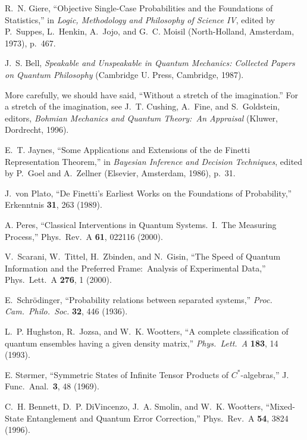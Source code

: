 \documentclass[12pt,aps,eqsecnum]{revtex4-1}
\begin{document}
\begin{thebibliography}{10}
R.~N. Giere, ``Objective Single-Case Probabilities and the Foundations
of Statistics,'' in {\sl Logic, Methodology and Philosophy of Science
IV}, edited by P.~Suppes, L.~Henkin, A.~Jojo, and G.~C. Moisil
(North-Holland, Amsterdam, 1973), p.~467.

J.~S. Bell, {\sl Speakable and Unspeakable in Quantum Mechanics:
Collected Papers on Quantum Philosophy\/} (Cambridge U. Press,
Cambridge, 1987).

More carefully, we should have said, ``Without a stretch of the
imagination.''  For a stretch of the imagination, see J.~T. Cushing,
A.~Fine, and S.~Goldstein, editors, {\sl  Bohmian Mechanics and Quantum
Theory:\ An Appraisal\/} (Kluwer, Dordrecht, 1996).

E.~T. Jaynes, ``Some Applications and Extensions of the de Finetti
Representation Theorem,'' in {\sl Bayesian Inference and Decision
Techniques}, edited by P.~Goel and A.~Zellner (Elsevier, Amsterdam,
1986), p.~31.

J.~von Plato, ``De Finetti's Earliest Works on the Foundations of
Probability,'' Erkenntnis {\bf 31}, 263 (1989).

A. Peres, ``Classical Interventions in Quantum Systems.\ I.\ The
Measuring Process,'' Phys.\ Rev.\ A {\bf 61}, 022116 (2000).

V.~Scarani, W.~Tittel, H.~Zbinden, and N.~Gisin, ``The Speed of Quantum
Information and the Preferred Frame:~Analysis of Experimental Data,''
Phys.\ Lett.\ A {\bf 276}, 1 (2000).

E.~Schr\"odinger, ``Probability relations between separated
systems,'' {\it Proc. Cam.\ Philo.\ Soc.} {\bf 32}, 446 (1936).

L.~P. Hughston, R.~Jozsa, and W.~K. Wootters, ``A complete
classification of quantum ensembles having a given density
matrix,'' {\it Phys.\ Lett.~A\/} {\bf 183}, 14 (1993).

E. St{\o}rmer, ``Symmetric States of Infinite Tensor Products of
$C^*$-algebras,'' J. Func.\ Anal.\ {\bf 3}, 48 (1969).

C.~H. Bennett, D.~P. DiVincenzo, J.~A. Smolin, and W.~K. Wootters,
``Mixed-State Entanglement and Quantum Error Correction,'' Phys.\
Rev.\ A {\bf 54}, 3824 (1996).


\end{thebibliography}
\end{document}
